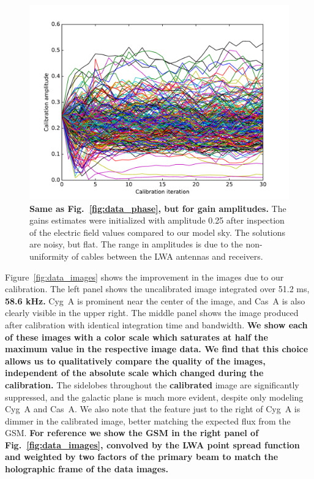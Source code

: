 \documentclass[a4paper,fleqn,usenatbib]{../mnras}
\begin{document}
\begin{figure}
\begin{center}
\includegraphics[width=\columnwidth]{fig8.pdf}
\caption{\textbf{Same as Fig.~\ref{fig:data_phase}, but for gain amplitudes.}
The 
gains estimates were initialized with amplitude 0.25 after inspection of the electric field values 
compared to our model sky. The solutions are noisy, but flat. The range in amplitudes is due to 
the non-uniformity of cables between the LWA antennas and receivers.
}
\label{fig:data_amp}
\end{center}
\end{figure}

Figure~\ref{fig:data_images} shows the improvement in the images due to our calibration. The 
left panel shows the uncalibrated image integrated over 51.2 ms, \textbf{58.6 kHz.} Cyg~A is prominent 
near the center of the image, and Cas~A is also clearly visible in the upper right. The middle 
panel shows the image produced after calibration with identical integration time and bandwidth. 
\textbf{We show each of these images with a color scale which saturates at half the
maximum value in the respective image data. We find that this choice allows us to
qualitatively compare the quality of the images, independent of the absolute scale which
changed during the calibration.}
The sidelobes throughout the \textbf{calibrated} image are significantly suppressed, and the galactic plane is 
much more evident, despite only modeling Cyg~A and Cas~A. We also note that the feature 
just to the right of Cyg~A is dimmer in the calibrated image, better matching the expected flux 
from the GSM. 
\textbf{For reference we show the GSM in the right panel of 
Fig.~\ref{fig:data_images}, convolved by the LWA point spread function and weighted
by  two factors of the primary beam to match the holographic frame of the data images.}
\end{document}

